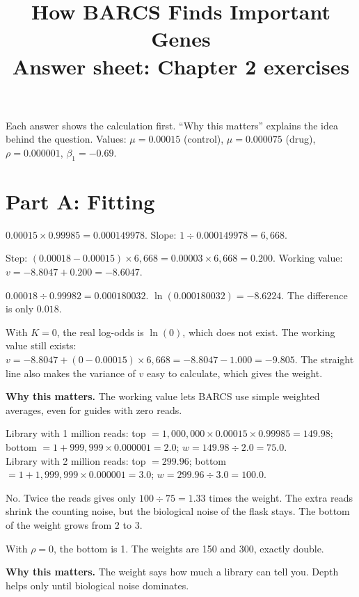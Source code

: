 \documentclass[12pt]{article}
\title{\textbf{How BARCS Finds Important Genes}\\[6pt]
\Large Answer sheet: Chapter 2 exercises}
\author{\guideauthor}
\date{\guidedate}
\newcommand{\why}[1]{\par\smallskip\noindent\textcolor{barcsgreen!70!black}{\textbf{Why this matters.}} #1}
\begin{document}
\maketitle
\thispagestyle{empty}

Each answer shows the calculation first. ``Why this matters'' explains the
idea behind the question. Values: $\mu = 0.00015$ (control), $\mu =
0.000075$ (drug), $\rho = 0.000001$, $\beta_1 = -0.69$.

\section*{Part A: Fitting}
\begin{exlist}
\item
\begin{parts}
\item $0.00015 \times 0.99985 = 0.000149978$. Slope: $1 \div 0.000149978 =
  6{,}668$.
\item Step: $(0.00018 - 0.00015) \times 6{,}668 = 0.00003 \times 6{,}668 =
  0.200$. Working value: $v = -8.8047 + 0.200 = -8.6047$.
\item $0.00018 \div 0.99982 = 0.000180032$. $\ln(0.000180032) = -8.6224$.
  The difference is only $0.018$.
\item With $K = 0$, the real log-odds is $\ln(0)$, which does not exist. The
  working value still exists: $v = -8.8047 + (0 - 0.00015) \times 6{,}668 =
  -8.8047 - 1.000 = -9.805$. The straight line also makes the variance of
  $v$ easy to calculate, which gives the weight.
\end{parts}
\why{The working value lets BARCS use simple weighted averages, even for
guides with zero reads.}

\item
\begin{parts}
\item Library with 1 million reads: top $= 1{,}000{,}000 \times 0.00015
  \times 0.99985 = 149.98$; bottom $= 1 + 999{,}999 \times 0.000001 = 2.0$;
  $w = 149.98 \div 2.0 = 75.0$.\\
  Library with 2 million reads: top $= 299.96$; bottom $= 1 + 1{,}999{,}999
  \times 0.000001 = 3.0$; $w = 299.96 \div 3.0 = 100.0$.
\item No. Twice the reads gives only $100 \div 75 = 1.33$ times the weight.
  The extra reads shrink the counting noise, but the biological noise of
  the flask stays. The bottom of the weight grows from 2 to 3.
\item With $\rho = 0$, the bottom is 1. The weights are 150 and 300, exactly
  double.
\end{parts}
\why{The weight says how much a library can tell you. Depth helps only
until biological noise dominates.}


\end{exlist}
\end{document}
